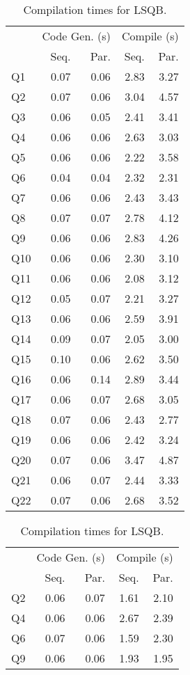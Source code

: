 \documentclass[acmsmall,screen,nonacm]{acmart}\settopmatter{printfolios=true,printccs=false,printacmref=false}
\begin{document}
\begin{table}[H]
\begin{minipage}[t]{0.48\linewidth}
    \caption{Compilation times for TPC-H.}
    \centering
\begin{tabular}{lrrrr}\toprule
& \multicolumn{2}{c}{Code Gen. (s)} & \multicolumn{2}{c}{Compile (s)}\\\cmidrule(lr){2-3}\cmidrule(lr){4-5}
& Seq. & Par. & Seq. & Par.\\\midrule
Q1 &  0.07 &  0.06 &  2.83 &  3.27 \\
Q2 &  0.07 &  0.06 &  3.04 &  4.57 \\
Q3 &  0.06 &  0.05 &  2.41 &  3.41 \\
Q4 &  0.06 &  0.06 &  2.63 &  3.03 \\
Q5 &  0.06 &  0.06 &  2.22 &  3.58 \\
Q6 &  0.04 &  0.04 &  2.32 &  2.31 \\
Q7 &  0.06 &  0.06 &  2.43 &  3.43 \\
Q8 &  0.07 &  0.07 &  2.78 &  4.12 \\
Q9 &  0.06 &  0.06 &  2.83 &  4.26 \\
Q10 &  0.06 &  0.06 &  2.30 &  3.10 \\
Q11 &  0.06 &  0.06 &  2.08 &  3.12 \\
Q12 &  0.05 &  0.07 &  2.21 &  3.27 \\
Q13 &  0.06 &  0.06 &  2.59 &  3.91 \\
Q14 &  0.09 &  0.07 &  2.05 &  3.00 \\
Q15 &  0.10 &  0.06 &  2.62 &  3.50 \\
Q16 &  0.06 &  0.14 &  2.89 &  3.44 \\
Q17 &  0.06 &  0.07 &  2.68 &  3.05 \\
Q18 &  0.07 &  0.06 &  2.43 &  2.77 \\
Q19 &  0.06 &  0.06 &  2.42 &  3.24 \\
Q20 &  0.07 &  0.06 &  3.47 &  4.87 \\
Q21 &  0.06 &  0.07 &  2.44 &  3.33 \\
Q22 &  0.07 &  0.06 &  2.68 &  3.52 \\\bottomrule
\end{tabular}
\end{minipage}
\begin{minipage}[t]{0.48\linewidth}
\caption{Compilation times for LSQB.}
    \centering
    \begin{tabular}{lrrrr}\toprule
& \multicolumn{2}{c}{Code Gen. (s)} & \multicolumn{2}{c}{Compile (s)}\\\cmidrule(lr){2-3}\cmidrule(lr){4-5}
& Seq. & Par. & Seq. & Par.\\\midrule
Q2 &  0.06 &  0.07 &  1.61 &  2.10 \\
Q4 &  0.06 &  0.06 &  2.67 &  2.39 \\
Q6 &  0.07 &  0.06 &  1.59 &  2.30 \\
Q9 &  0.06 &  0.06 &  1.93 &  1.95 \\\bottomrule
\end{tabular}
\end{minipage}
\end{table}
\end{document}
